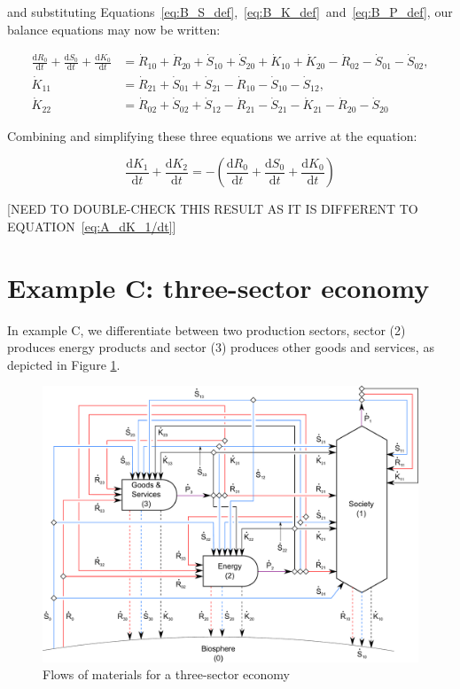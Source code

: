 \noindent{}and substituting
Equations~\ref{eq:B_S_def},~\ref{eq:B_K_def}~and~\ref{eq:B_P_def}, 
our balance equations may now be written:

\begin{align} \label{eq:B_CV_0_to_2_b}
	\frac{\mathrm{d}R_{0}}{\mathrm{d}t} 
	+ \frac{\mathrm{d}S_{0}}{\mathrm{d}t}	
	+ \frac{\mathrm{d}K_0}{\mathrm{d}t}		
	& = \dot{R}_{10} + \dot{R}_{20} 
	+ \dot{S}_{10} + \dot{S}_{20} 
	+ \dot{K}_{10} + \dot{K}_{20} 
	- \dot{R}_{02} 
	- \dot{S}_{01}
	- \dot{S}_{02}, 							\\
	\dot{K}_{11}
	& = \dot{R}_{21} 
	+ \dot{S}_{01} 
	+ \dot{S}_{21}
	- \dot{R}_{10} 
	- \dot{S}_{10}
	- \dot{S}_{12},							\\
	\dot{K}_{22}
	& = \dot{R}_{02} 
	+ \dot{S}_{02} 
	+ \dot{S}_{12} 
	- \dot{R}_{21}
	- \dot{S}_{21}
	- \dot{K}_{21}
	- \dot{R}_{20} 
	- \dot{S}_{20} 
\end{align}

Combining and simplifying these three equations we arrive at the equation:

\begin{equation}\label{eq:B_CV_all}
	\frac{\mathrm{d}K_{1}}{\mathrm{d}t}
	+ \frac{\mathrm{d}K_{2}}{\mathrm{d}t}
	= - \left(\frac{\mathrm{d}R_{0}}{\mathrm{d}t} 
	+ \frac{\mathrm{d}S_{0}}{\mathrm{d}t}	
	+ \frac{\mathrm{d}K_0}{\mathrm{d}t}\right)
\end{equation}

[NEED TO DOUBLE-CHECK THIS RESULT AS IT IS DIFFERENT TO EQUATION~\ref{eq:A_dK_1/dt}]


\section{Example C: three-sector economy} %
\label{sec:C_materials}

In example C, we differentiate between two production sectors, sector (2) produces energy
products and sector (3) produces other goods and services, as depicted in Figure
\ref{fig:C_materials}.

\begin{figure}[!ht]
\centering
\includegraphics[width=0.8\linewidth]{Part_1/Chapter_Materials/images/3_sector_materials.pdf}
\caption[Flows of materials for a three-sector economy]{Flows of materials for a three-sector economy}
\label{fig:C_materials}
\end{figure}

